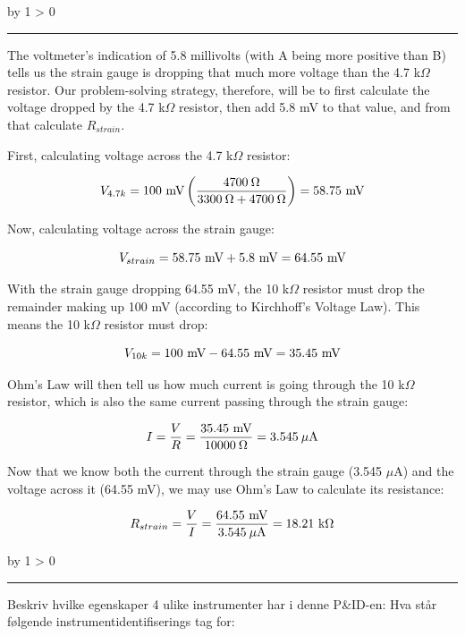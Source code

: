 \documentclass[12pt,a4paper]{article}
\def\oppgave{
            \advance\questnum by 1
            \ifnum \questnum > 0
                 \hrule
                 \vskip 3pt
                 \leftline{Oppgave \the\questnum}
                 \vskip 3pt \fi}
\def\notes{
           \advance\explnum by 1
           \ifnum \explnum > 0
                \hrule
                \vskip 3pt
                \leftline{Notes \the\explnum}
                \vskip 3pt \fi}
\begin{document}
\notes{} 

The voltmeter's indication of 5.8 millivolts (with A being more positive than B) tells us the strain gauge is dropping that much more voltage than the 4.7 k$\Omega$ resistor.  Our problem-solving strategy, therefore, will be to first calculate the voltage dropped by the 4.7 k$\Omega$ resistor, then add 5.8 mV to that value, and from that calculate $R_{strain}$.

\vskip 10pt

First, calculating voltage across the 4.7 k$\Omega$ resistor:

$$V_{4.7k} = 100 \hbox{ mV} \left(4700 \> \Omega \over {3300 \> \Omega + 4700 \> \Omega}\right) = 58.75 \hbox{ mV}$$

Now, calculating voltage across the strain gauge:

$$V_{strain} = 58.75 \hbox{ mV} + 5.8 \hbox{ mV} = 64.55 \hbox{ mV}$$

With the strain gauge dropping 64.55 mV, the 10 k$\Omega$ resistor must drop the remainder making up 100 mV (according to Kirchhoff's Voltage Law).  This means the 10 k$\Omega$ resistor must drop:

$$V_{10k} = 100 \hbox{ mV} - 64.55 \hbox{ mV} = 35.45 \hbox{ mV}$$

Ohm's Law will then tell us how much current is going through the 10 k$\Omega$ resistor, which is also the same current passing through the strain gauge:

$$I = {V \over R} = {35.45 \hbox{ mV} \over 10000 \> \Omega} = 3.545 \> \mu\hbox{A}$$

Now that we know both the current through the strain gauge (3.545 $\mu$A) and the voltage across it (64.55 mV), we may use Ohm's Law to calculate its resistance:

$$R_{strain} = {V \over I} = {64.55 \hbox{ mV} \over 3.545 \> \mu\hbox{A}} = 18.21 \hbox{ k}\Omega$$


\vfil \eject 


\oppgave{} 


Beskriv hvilke egenskaper 4 ulike instrumenter har i denne P\&ID-en:
Hva står følgende instrumentidentifiserings tag for:
\end{document}
